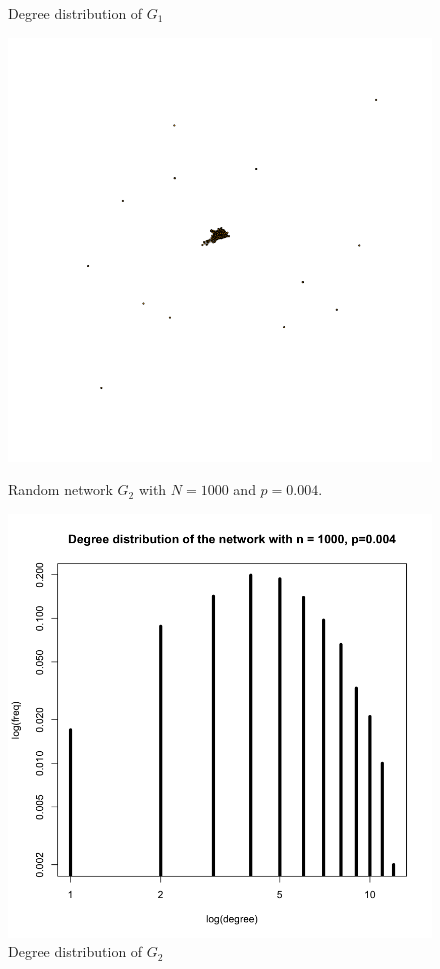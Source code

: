 \documentclass[draftcls,12pt,onecolumn]{IEEEtran}
\begin{document}
\begin{figure}[H]
\begin{minipage}[t]{0.48\textwidth}
\caption{Degree distribution of $G_1$}
\label{fig2}
\end{minipage}
\end{figure}


\begin{figure}[H]
\centering
\begin{minipage}[t]{0.48\textwidth}
\centering
\includegraphics[scale=0.2]{figures_part1_1/output_4_0.png}
\caption{Random network $G_2$ with $N=1000$ and $p=0.004$.}
\label{fig3}
\end{minipage}
\begin{minipage}[t]{0.48\textwidth}
\centering
\includegraphics[scale=0.2]{figures_part1_1/output_9_0.png}
\caption{Degree distribution of $G_2$}
\label{fig4}
\end{minipage}
\end{figure}
\end{document}
